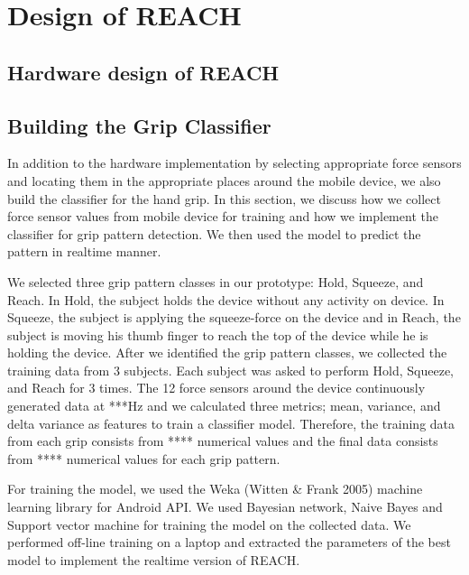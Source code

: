 \section{Design of REACH}

\subsection{Hardware design of REACH}


\subsection{Building the Grip Classifier}
In addition to the hardware implementation by selecting appropriate force sensors and locating them in the appropriate places around the mobile device, we also build the classifier for the hand grip. In this section, we discuss how we collect force sensor values from mobile device for training and how we implement the classifier for grip pattern detection. We then used the model to predict the pattern in realtime manner. 
\par
We selected three grip pattern classes in our prototype: Hold, Squeeze, and Reach. In Hold, the subject holds the device without any activity on device. In Squeeze, the subject is applying the squeeze-force on the device and in Reach, the subject is moving his thumb finger to reach the top of the device while he is holding the device. After we identified the grip pattern classes, we collected the training data from 3 subjects. Each subject was asked to perform Hold, Squeeze, and Reach for 3 times. The 12 force sensors around the device continuously generated data at ***Hz and we calculated three metrics; mean, variance, and delta variance as features to train a classifier model. Therefore, the training data from each grip consists from **** numerical values and the final data consists from **** numerical values for each grip pattern.
\par
For training the model,  we used the Weka (Witten \& Frank 2005) machine learning library for Android API. We used Bayesian network, Naive Bayes and Support vector machine for training the model on the collected data. We performed off-line training on a laptop and extracted the parameters of the best model to implement the realtime version of REACH.




    